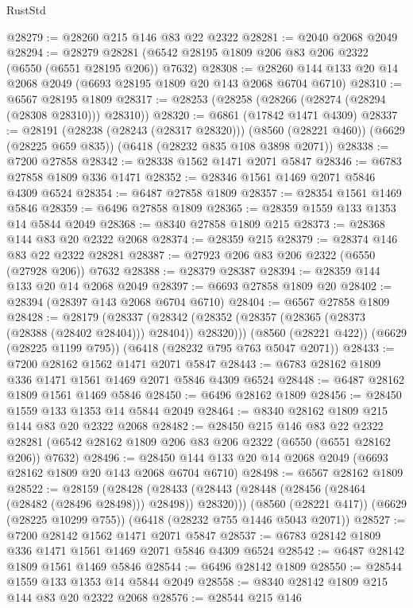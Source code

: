 \begin{lexlean}{RustStd}
\begin{coremodule}
@28279 := @28260 @215 @146 @83 @22 @2322
@28281 := @2040 @2068 @2049
@28294 := @28279 @28281 (@6542 @28195 @1809 @206 @83 @206 @2322 (@6550 (@6551 @28195 @206)) @7632)
@28308 := @28260 @144 @133 @20 @14 @2068 @2049 (@6693 @28195 @1809 @20 @143 @2068 @6704 @6710)
@28310 := @6567 @28195 @1809
@28317 := @28253 (@28258 (@28266 (@28274 (@28294 (@28308 @28310))) @28310))
@28320 := @6861 (@17842 @1471 @4309)
@28337 := @28191
    (@28238 (@28243 (@28317 @28320)))
    (@8560 (@28221 @460))
    (@6629 (@28225 @659 @835))
    (@6418 (@28232 @835 @108 @3898 @2071))
@28338 := @7200 @27858
@28342 := @28338 @1562 @1471 @2071 @5847
@28346 := @6783 @27858 @1809 @336 @1471
@28352 := @28346 @1561 @1469 @2071 @5846 @4309 @6524
@28354 := @6487 @27858 @1809
@28357 := @28354 @1561 @1469 @5846
@28359 := @6496 @27858 @1809
@28365 := @28359 @1559 @133 @1353 @14 @5844 @2049
@28368 := @8340 @27858 @1809 @215
@28373 := @28368 @144 @83 @20 @2322 @2068
@28374 := @28359 @215
@28379 := @28374 @146 @83 @22 @2322 @28281
@28387 := @27923 @206 @83 @206 @2322 (@6550 (@27928 @206)) @7632
@28388 := @28379 @28387
@28394 := @28359 @144 @133 @20 @14 @2068 @2049
@28397 := @6693 @27858 @1809 @20
@28402 := @28394 (@28397 @143 @2068 @6704 @6710)
@28404 := @6567 @27858 @1809
@28428 := @28179
    (@28337 (@28342 (@28352 (@28357 (@28365 (@28373 (@28388 (@28402 @28404))) @28404)) @28320)))
    (@8560 (@28221 @422))
    (@6629 (@28225 @1199 @795))
    (@6418 (@28232 @795 @763 @5047 @2071))
@28433 := @7200 @28162 @1562 @1471 @2071 @5847
@28443 := @6783 @28162 @1809 @336 @1471 @1561 @1469 @2071 @5846 @4309 @6524
@28448 := @6487 @28162 @1809 @1561 @1469 @5846
@28450 := @6496 @28162 @1809
@28456 := @28450 @1559 @133 @1353 @14 @5844 @2049
@28464 := @8340 @28162 @1809 @215 @144 @83 @20 @2322 @2068
@28482 := @28450
    @215
    @146
    @83
    @22
    @2322
    @28281
    (@6542 @28162 @1809 @206 @83 @206 @2322 (@6550 (@6551 @28162 @206)) @7632)
@28496 := @28450 @144 @133 @20 @14 @2068 @2049 (@6693 @28162 @1809 @20 @143 @2068 @6704 @6710)
@28498 := @6567 @28162 @1809
@28522 := @28159
    (@28428 (@28433 (@28443 (@28448 (@28456 (@28464 (@28482 (@28496 @28498))) @28498)) @28320)))
    (@8560 (@28221 @417))
    (@6629 (@28225 @10299 @755))
    (@6418 (@28232 @755 @1446 @5043 @2071))
@28527 := @7200 @28142 @1562 @1471 @2071 @5847
@28537 := @6783 @28142 @1809 @336 @1471 @1561 @1469 @2071 @5846 @4309 @6524
@28542 := @6487 @28142 @1809 @1561 @1469 @5846
@28544 := @6496 @28142 @1809
@28550 := @28544 @1559 @133 @1353 @14 @5844 @2049
@28558 := @8340 @28142 @1809 @215 @144 @83 @20 @2322 @2068
@28576 := @28544
    @215
    @146

\end{coremodule}
\end{lexlean}
